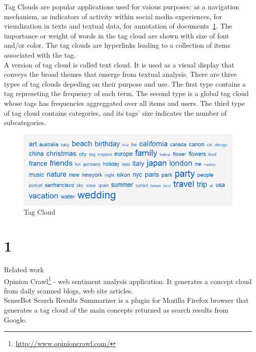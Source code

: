 Tag Clouds are popular applications used for vaious purposes: as a navigation mechanism, as indicators of activity within social media experiences, for visualization in texts and textual data, for annotation of documents~\ref{fig:tagcloud}. The importance or weight of words in the tag cloud are shown with size of font and/or color. The tag clouds are hyperlinks leading to a collection of items associated with the tag.\\
A version of tag cloud is called text cloud. It is used as a visual display that conveys the broad themes that emerge from textual analysis.  
There are three types of tag clouds depeding on their purpose and use. The first type contains a tag represeting the frequency of each term. The second type is a global tag cloud whose tags has frequencies aggreggated over all items and users. The third type of tag cloud contains categories, and its tags' size indicates the number of subcategories.\\
%
%
\begin{figure}[htbp]
	\centering
	\includegraphics[width=\ScaleIfNeeded]{img/tagcloud} 
	\caption{Tag Cloud}
	\label{fig:tagcloud}
\end{figure}

\section{1}
\label{sec:semannot:1}
Related work \\
Opinion Crawl\footnote{\url{http://www.opinioncrawl.com/}} - web sentiment analysis application. It generates a concept cloud from daily scanned blogs, web site articles. \\

SenseBot Search Results Summarizer is a plugin for Mozilla Firefox browser that generates a tag cloud of the main concepts returned as search results from Google. \\

